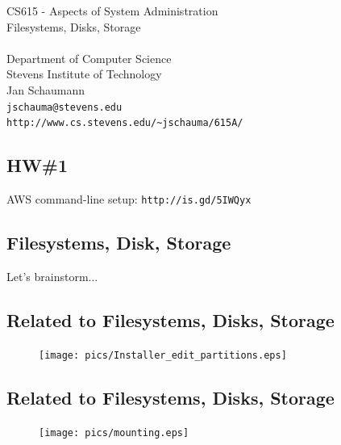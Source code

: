 \documentclass[xga]{xdvislides}
\begin{document}
\setfontphv

\lhead{\slidetitle}				%
\cfoot{\relax}					%
\rfoot{\Gray{\today}}

\vspace*{\fill}
\begin{center}
	\Hugesize
		CS615 - Aspects of System Administration\\ [1em]
		Filesystems, Disks, Storage\\ [1em]
	\hspace*{5mm}\blueline\\ [1em]
	\Normalsize
		Department of Computer Science\\
		Stevens Institute of Technology\\
		Jan Schaumann\\
		\verb+jschauma@stevens.edu+ \\
		\verb+http://www.cs.stevens.edu/~jschauma/615A/+
\end{center}
\vspace*{\fill}

\subsection{HW\#1}
AWS command-line setup: {\tt http://is.gd/5IWQyx}

\subsection{Filesystems, Disk, Storage}
Let's brainstorm...

\subsection{Related to Filesystems, Disks, Storage}
\begin{figure}[hb]
	\begin{center}
		\texttt{[image: pics/Installer\_edit\_partitions.eps]} \\
	\end{center}
\end{figure}

\subsection{Related to Filesystems, Disks, Storage}
\begin{figure}[hb]
	\begin{center}
		\texttt{[image: pics/mounting.eps]} \\
	\end{center}
\end{figure}
\end{document}

